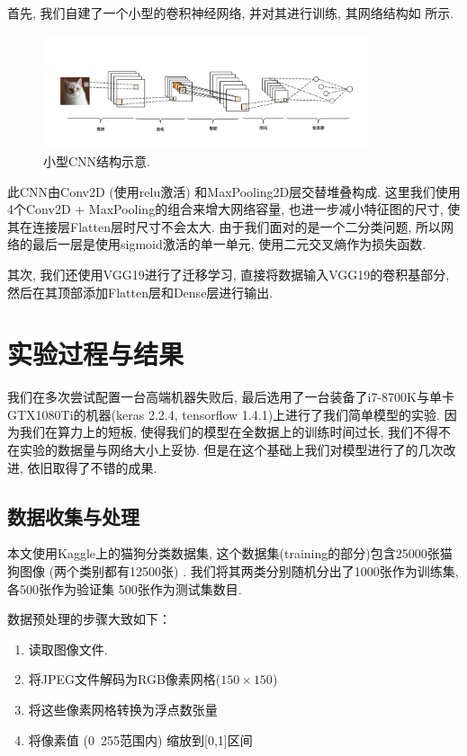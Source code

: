 \documentclass[lang=cn,11pt]{elegantpaper}
\begin{document}
首先, 我们自建了一个小型的卷积神经网络, 并对其进行训练, 其网络结构如  所示. 
\begin{figure}[hbtp]
	\centering
	  \includegraphics[width=0.85\textwidth]{cnn1.png}
	  \tiny
	  \caption{小型CNN结构示意.\label{fig:cnn1}}
\end{figure}
\normalsize
此CNN由Conv2D (使用relu激活) 和MaxPooling2D层交替堆叠构成. 这里我们使用4个Conv2D + MaxPooling的组合来增大网络容量, 也进一步减小特征图的尺寸, 使其在连接层Flatten层时尺寸不会太大. 由于我们面对的是一个二分类问题, 所以网络的最后一层是使用sigmoid激活的单一单元, 使用二元交叉熵作为损失函数. 

其次, 我们还使用VGG19进行了迁移学习, 直接将数据输入VGG19的卷积基部分, 然后在其顶部添加Flatten层和Dense层进行输出. 

\section{实验过程与结果}

我们在多次尝试配置一台高端机器失败后, 最后选用了一台装备了i7-8700K与单卡GTX1080Ti的机器(keras 2.2.4, tensorflow 1.4.1)上进行了我们简单模型的实验. 因为我们在算力上的短板, 使得我们的模型在全数据上的训练时间过长, 我们不得不在实验的数据量与网络大小上妥协. 但是在这个基础上我们对模型进行了的几次改进, 依旧取得了不错的成果. 

\subsection{数据收集与处理}
本文使用Kaggle上的猫狗分类数据集, 这个数据集(training的部分)包含25000张猫狗图像 (两个类别都有12500张) . 我们将其两类分别随机分出了1000张作为训练集, 各500张作为验证集 500张作为测试集数目.

  数据预处理的步骤大致如下：

\begin{enumerate}
	\item 读取图像文件.
	\item 将JPEG文件解码为RGB像素网格($150\times 150$)
	\item 将这些像素网格转换为浮点数张量
	\item 将像素值 (0~255范围内) 缩放到[0,1]区间
\end{enumerate}
\end{document}
